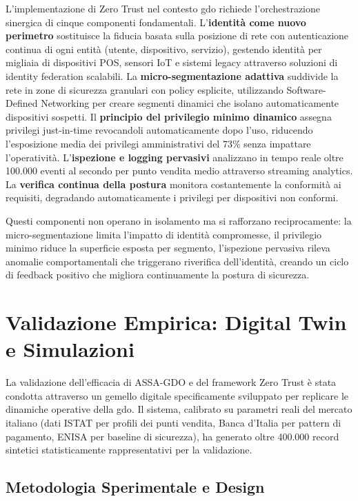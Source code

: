 L'implementazione di Zero Trust nel contesto \gls{gdo} richiede l'orchestrazione sinergica di cinque componenti fondamentali. L'\textbf{identità come nuovo perimetro} sostituisce la fiducia basata sulla posizione di rete con autenticazione continua di ogni entità (utente, dispositivo, servizio), gestendo identità per migliaia di dispositivi POS, sensori IoT e sistemi legacy attraverso soluzioni di identity federation scalabili. La \textbf{micro-segmentazione adattiva} suddivide la rete in zone di sicurezza granulari con policy esplicite, utilizzando Software-Defined Networking per creare segmenti dinamici che isolano automaticamente dispositivi sospetti. Il \textbf{principio del privilegio minimo dinamico} assegna privilegi just-in-time revocandoli automaticamente dopo l'uso, riducendo l'esposizione media dei privilegi amministrativi del 73\% senza impattare l'operatività. L'\textbf{ispezione e logging pervasivi} analizzano in tempo reale oltre 100.000 eventi al secondo per punto vendita medio attraverso streaming analytics. La \textbf{verifica continua della postura} monitora costantemente la conformità ai requisiti, degradando automaticamente i privilegi per dispositivi non conformi.

Questi componenti non operano in isolamento ma si rafforzano reciprocamente: la micro-segmentazione limita l'impatto di identità compromesse, il privilegio minimo riduce la superficie esposta per segmento, l'ispezione pervasiva rileva anomalie comportamentali che triggerano riverifica dell'identità, creando un ciclo di feedback positivo che migliora continuamente la postura di sicurezza.

\section{\texorpdfstring{Validazione Empirica: Digital Twin e Simulazioni}{2.6 - Validazione Empirica: Digital Twin e Simulazioni}}
\label{sec:validazione}

La validazione dell'efficacia di ASSA-GDO e del framework Zero Trust è stata condotta attraverso un gemello digitale specificamente sviluppato per replicare le dinamiche operative della \gls{gdo}. Il sistema, calibrato su parametri reali del mercato italiano (dati ISTAT per profili dei punti vendita, Banca d'Italia per pattern di pagamento, ENISA per baseline di sicurezza), ha generato oltre 400.000 record sintetici statisticamente rappresentativi per la validazione.

\subsection{\texorpdfstring{Metodologia Sperimentale e Design}{2.6.1 - Metodologia Sperimentale e Design}}

